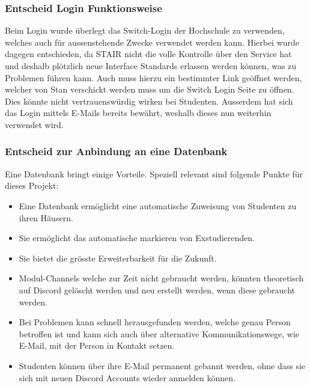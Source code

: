 \documentclass[a4paper, table]{article}
\begin{document}
\subsubsection*{Entscheid Login Funktionsweise}
Beim Login wurde überlegt das Switch-Login der Hochschule zu verwenden, welches auch für aussenstehende Zwecke verwendet werden kann.
Hierbei wurde dagegen entschieden, da STAIR nicht die volle Kontrolle über den Service hat und deshalb plötzlich neue Interface Standards erlassen werden können, was zu Problemen führen kann.
Auch muss hierzu ein bestimmter Link geöffnet werden, welcher von Stan verschickt werden muss um die Switch Login Seite zu öffnen.
Dies könnte nicht vertrauenswürdig wirken bei Studenten.
Ausserdem hat sich das Login mittels E-Mails bereits bewährt, weshalb dieses nun weiterhin verwendet wird.


\subsubsection*{Entscheid zur Anbindung an eine Datenbank}

Eine Datenbank bringt einige Vorteile.
Speziell relevant sind folgende Punkte für dieses Projekt:
\begin{itemize}
    \item Eine Datenbank ermöglicht eine automatische Zuweisung von Studenten zu ihren Häusern.
    \item Sie ermöglicht das automatische markieren von Exstudierenden.
    \item Sie bietet die grösste Erweiterbarkeit für die Zukunft.
    \item Modul-Channels welche zur Zeit nicht gebraucht werden, könnten theoretisch auf Discord gelöscht werden und neu erstellt werden, wenn diese gebraucht werden.
    \item Bei Problemen kann schnell herausgefunden werden, welche genau Person betroffen ist und kann sich auch über alternative Kommunikationswege, wie E-Mail, mit der Person in Kontakt setzen.
    \item Studenten können über ihre E-Mail permanent gebannt werden, ohne dass sie sich mit neuen Discord Accounts wieder anmelden können.
\end{itemize}
\end{document}

